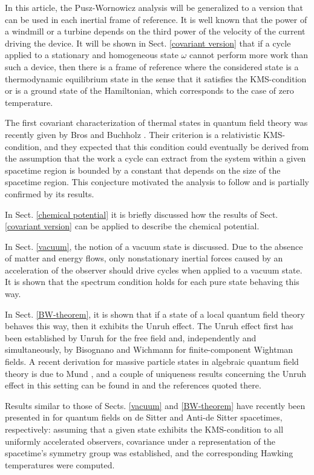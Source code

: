 \documentclass[a4paper,11pt]{article}
\def\go{\omega}
\begin{document}
In this article, the Pusz-Wornowicz analysis
will be generalized to a version that can be used in each
inertial frame of reference. It is well known that
the power of a windmill or a turbine depends on the third power of the
velocity of the current driving the device. It will be shown
in Sect. \ref{covariant version} that if a cycle applied
to a stationary and homogeneous state $\go$ cannot perform more
work than such a device, then
there is a frame of reference where the considered state is a thermodynamic
equilibrium state in the sense that it satisfies the KMS-condition or is a
ground state of the Hamiltonian,
which corresponds to the case of zero temperature.

The first covariant characterization of
thermal states in quantum field theory was recently given by Bros and
Buchholz \cite{BB94}.
Their criterion is a relativistic KMS-condition, and they expected that this
condition could eventually be derived from the assumption that the
work a cycle can extract from the system within a given spacetime
region is bounded by a constant that depends on the size of the
spacetime region. This conjecture motivated the analysis to follow
and is partially confirmed by its results.

In Sect. \ref{chemical potential} it is briefly discussed
how the results of Sect. \ref{covariant version} can be applied
to describe the chemical potential.

In Sect. \ref{vacuum}, the notion of a vacuum state is discussed.
Due to the
absence of matter and energy flows, only nonstationary inertial forces
caused by an acceleration of the observer should drive cycles when
applied to a vacuum state. It is shown that the spectrum condition
holds for each pure state behaving this way.

In Sect. \ref{BW-theorem}, it is shown that
if a state of a local quantum field theory behaves this way, then
it exhibits the Unruh effect. The Unruh effect first has been
established by Unruh \cite{Unr76} for the free field and,
independently and simultaneously,
by Bisognano and Wichmann \cite{BW75,BW76} for finite-component
Wightman fields. A recent derivation for
massive particle states in algebraic quantum field theory is due to
Mund \cite{Mun01}, and a couple of uniqueness results concerning
the Unruh effect in this setting can be found in \cite{Bor00,Kuc00}
and the references quoted there.

Results similar to those of Sects. \ref{vacuum} and \ref{BW-theorem}
have recently been presented in \cite{BB99,BFS99} for quantum
fields on de Sitter and Anti-de Sitter spacetimes,
respectively: assuming that a given state exhibits
the KMS-condition to all uniformly accelerated observers,
covariance under a representation
of the spacetime's symmetry group was established, and the
corresponding Hawking temperatures were computed.
\end{document}
